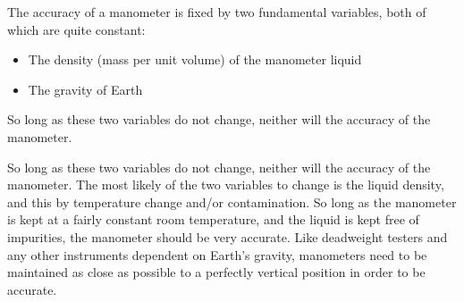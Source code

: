 
The accuracy of a manometer is fixed by two fundamental variables, both of which are quite constant:

\begin{itemize}
\item{} The density (mass per unit volume) of the manometer liquid
\item{} The gravity of Earth
\end{itemize}

So long as these two variables do not change, neither will the accuracy of the manometer.







So long as these two variables do not change, neither will the accuracy of the manometer.  The most likely of the two variables to change is the liquid density, and this by temperature change and/or contamination.  So long as the manometer is kept at a fairly constant room temperature, and the liquid is kept free of impurities, the manometer should be very accurate.  Like deadweight testers and any other instruments dependent on Earth's gravity, manometers need to be maintained as close as possible to a perfectly vertical position in order to be accurate.




